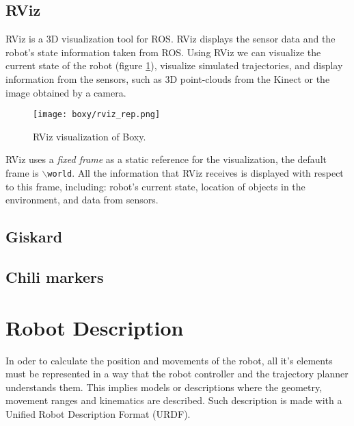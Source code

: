 \subsection{RViz}
\label{subsec:rviz}

RViz is a 3D visualization tool for ROS. RViz displays the sensor data and the robot's state information taken from ROS. Using RViz we can visualize the current state of the robot (figure \ref{fig:rviz}), visualize simulated trajectories, and display information from the sensors, such as 3D point-clouds from the Kinect or the image obtained by a camera.

\begin{figure}[H]
	\centering
	\texttt{[image: boxy/rviz\_rep.png]}
	\vspace{-10pt}
	\caption{RViz visualization of Boxy.}
	\vspace{-15pt}
	\label{fig:rviz}
\end{figure}

RViz uses a \textit{fixed frame} as a static reference for the visualization, the default frame is  \texttt{$\backslash$world}. All the information that RViz receives is displayed with respect to this frame, including: robot's current state, location of objects in the environment, and data from sensors.

\subsection{Giskard}
\label{subsec:giskard}

\subsection{Chili markers}



\section{Robot Description}
\label{sec:urdf}

In oder to calculate the position and movements of the robot, all it's elements must be  represented in a way that the robot controller and the trajectory planner understands them. This implies models or descriptions where the geometry, movement ranges and kinematics are described. Such description is made with a Unified Robot Description Format (URDF).



